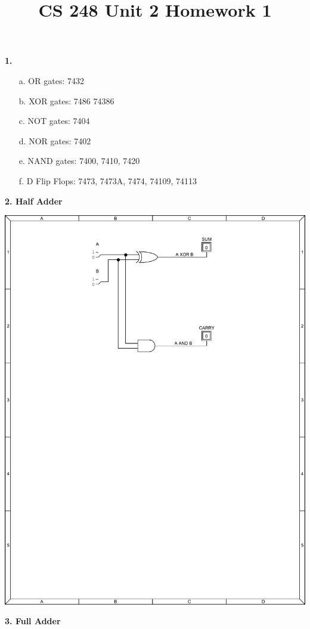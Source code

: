 \documentclass[12pt]{article}
\title{CS 248 Unit 2 Homework 1}
\begin{document}
    \bf{1.}
    \begin{itemize}
        \item[a.] OR gates: 7432
        \item[b.] XOR gates: 7486 74386
        \item[c.] NOT gates: 7404
        \item[d.] NOR gates: 7402
        \item[e.] NAND gates: 7400, 7410, 7420
        \item[f.] D Flip Flops: 7473, 7473A, 7474, 74109, 74113
    \end{itemize}

    \bf{2.} Half Adder

        \includegraphics[scale=.5]{halfadderpdf}

    \bf{3.} Full Adder
\end{document}
